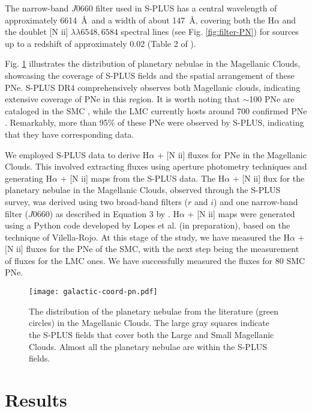 \documentclass[baaa]{baaa}
\begin{document}
The narrow-band $J0660$ filter used in S-PLUS has a central wavelength of approximately 6614~\AA\ and a width of about 147~\AA, covering both the H$\alpha$ and the doublet [N {\sc ii}] $\lambda\lambda 6548,6584$ spectral lines (see Fig. \ref{fig:filter-PN}) for sources up to a redshift of approximately 0.02 (Table 2 of \citealp{Mendes:2019}).

Fig. \ref{fig:distr-PN} illustrates the distribution of planetary nebulae  in the Magellanic Clouds, showcasing the coverage of S-PLUS fields and the spatial arrangement of these PNe. S-PLUS DR4 comprehensively observes both Magellanic clouds, indicating extensive coverage of PNe in this region. It is worth noting that $\sim$100 PNe are cataloged in the SMC \citep{Jacoby:2002}, while the LMC currently hosts around 700 confirmed PNe \citep{Reid:2014}. Remarkably, more than 95\% of these PNe were observed by S-PLUS, indicating that they have corresponding data.

We employed S-PLUS data to derive H$\alpha$ + [N {\sc ii}] fluxes for PNe in the Magellanic Clouds. This involved extracting fluxes using aperture photometry techniques and generating H$\alpha$ + [N {\sc ii}] maps from the S-PLUS data. The H$\alpha$ + [N {\sc ii}] flux for the planetary nebulae in the Magellanic Clouds, observed through the S-PLUS survey, was derived using two broad-band filters ($r$ and $i$) and one narrow-band filter ($J$0660) as described in Equation 3 by \citet{Vilella-Rojo:2015}. H$\alpha$ + [N {\sc ii}] maps were generated using a Python code developed by Lopes et al. (in preparation), based on the technique of Vilella-Rojo. At this stage of the study, we have measured the H$\alpha$ + [N {\sc ii}] fluxes for the PNe of the SMC, with the next step being the measurement of fluxes for the LMC ones. We have successfully measured the fluxes for 80 SMC PNe. 


\begin{figure}
\centering
\texttt{[image: galactic-coord-pn.pdf]}
\caption{The distribution of the planetary nebulae from the literature (green circles) in the Magellanic Clouds. The large gray squares indicate the S-PLUS fields that cover both the Large and Small Magellanic Clouds. Almost all the planetary nebulae are within the S-PLUS fields.}%
\label{fig:distr-PN}
\end{figure}


\section{Results}\label{sec:results}
\end{document}
